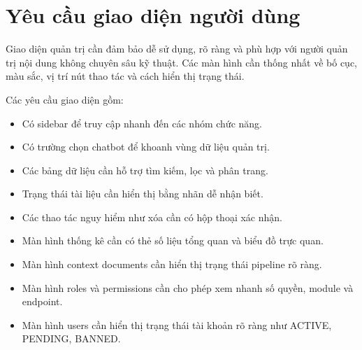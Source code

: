 \section{Yêu cầu giao diện người dùng}

Giao diện quản trị cần đảm bảo dễ sử dụng, rõ ràng và phù hợp với người quản trị nội dung không chuyên sâu kỹ thuật. Các màn hình cần thống nhất về bố cục, màu sắc, vị trí nút thao tác và cách hiển thị trạng thái.

Các yêu cầu giao diện gồm:

\begin{itemize}
    \item Có sidebar để truy cập nhanh đến các nhóm chức năng.
    \item Có trường chọn chatbot để khoanh vùng dữ liệu quản trị.
    \item Các bảng dữ liệu cần hỗ trợ tìm kiếm, lọc và phân trang.
    \item Trạng thái tài liệu cần hiển thị bằng nhãn dễ nhận biết.
    \item Các thao tác nguy hiểm như xóa cần có hộp thoại xác nhận.
    \item Màn hình thống kê cần có thẻ số liệu tổng quan và biểu đồ trực quan.
    \item Màn hình context documents cần hiển thị trạng thái pipeline rõ ràng.
    \item Màn hình roles và permissions cần cho phép xem nhanh số quyền, module và endpoint.
    \item Màn hình users cần hiển thị trạng thái tài khoản rõ ràng như ACTIVE, PENDING, BANNED.
\end{itemize}
